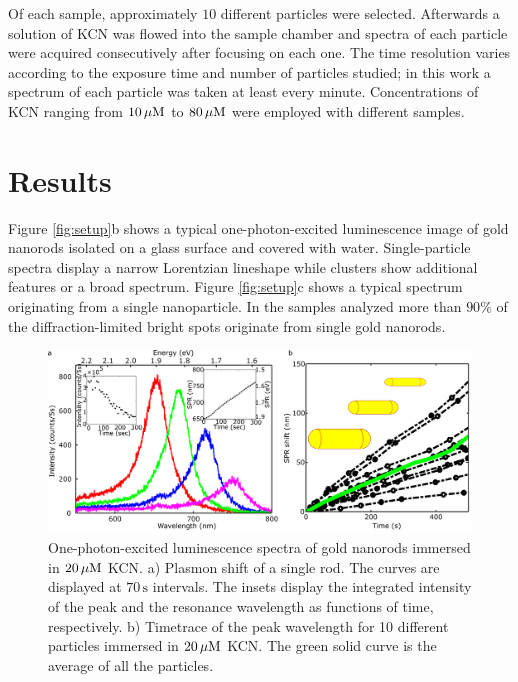 Of each sample, approximately $10$ different particles were selected. Afterwards
a solution of KCN was flowed into the sample chamber and spectra of each
particle were acquired consecutively after focusing on each one. The time
resolution varies according to the exposure time and number of particles
studied; in this work a spectrum of each particle was taken at least every
minute. Concentrations of KCN ranging from $10\,\mu\textrm{M}$ to $80\,\mu\textrm{M}$ were employed with
different samples.

\section{Results}

Figure \ref{fig:setup}b shows a typical one-photon-excited luminescence image
of gold nanorods isolated on a glass surface and covered with water.
Single-particle spectra display a narrow Lorentzian lineshape\cite{Funston2009}
while clusters show additional features or a broad spectrum. Figure
\ref{fig:setup}c shows a typical spectrum originating from a single
nanoparticle. In the samples analyzed more than $90\%$ of the
diffraction-limited bright spots originate from single gold nanorods. 

\begin{figure}[htp]
 \centering
 \includegraphics[width=\textwidth]{Chapters/02_KCN/Figures/02_Experimental/Experimental.png}
 \caption{One-photon-excited luminescence spectra of gold nanorods immersed in
 $20\,\mu\textrm{M}$ KCN. a) Plasmon shift of a single rod. The curves are displayed at
 $70\,\text{s}$ intervals. The insets display the integrated intensity of the
 peak and the resonance wavelength as functions of time, respectively. b)
 Timetrace of the peak wavelength for 10 different particles immersed in
 $20\,\mu\textrm{M}$ KCN. The green solid curve is the average of all the particles.}
 \label{fig:plasmon_single_rod}
\end{figure}

